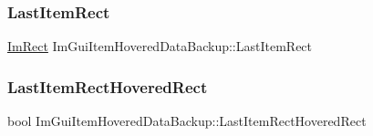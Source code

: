 \subsubsection{\texorpdfstring{Last\+Item\+Rect}{LastItemRect}}
{\footnotesize\ttfamily \hyperlink{struct_im_rect}{Im\+Rect} Im\+Gui\+Item\+Hovered\+Data\+Backup\+::\+Last\+Item\+Rect}

\hypertarget{struct_im_gui_item_hovered_data_backup_a48dd47c573d5299de25be908d77f23f0}{}\label{struct_im_gui_item_hovered_data_backup_a48dd47c573d5299de25be908d77f23f0} 
\subsubsection{\texorpdfstring{Last\+Item\+Rect\+Hovered\+Rect}{LastItemRectHoveredRect}}
{\footnotesize\ttfamily bool Im\+Gui\+Item\+Hovered\+Data\+Backup\+::\+Last\+Item\+Rect\+Hovered\+Rect}


